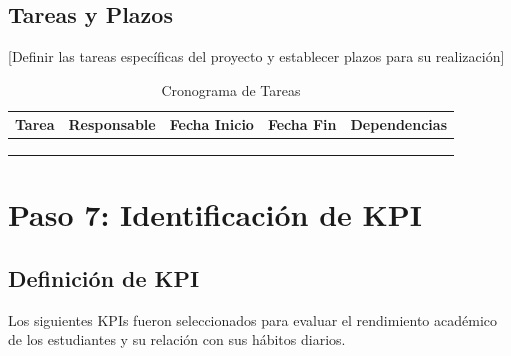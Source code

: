 \documentclass[12pt,letterpaper]{report}
\begin{document}
\subsection{Tareas y Plazos}
[Definir las tareas específicas del proyecto y establecer plazos para su realización]

\begin{table}[H]
    \centering
    \begin{tabularx}{\textwidth}{|X|X|X|X|X|}
        \hline
        \textbf{Tarea} & \textbf{Responsable} & \textbf{Fecha Inicio} & \textbf{Fecha Fin} & \textbf{Dependencias} \\
        \hline
        & & & & \\
        \hline
        & & & & \\
        \hline
        & & & & \\
        \hline
    \end{tabularx}
    \caption{Cronograma de Tareas}
\end{table}

\section{Paso 7: Identificación de KPI}

\subsection{Definición de KPI}
Los siguientes KPIs fueron seleccionados para evaluar el rendimiento académico de los estudiantes y su relación con sus hábitos diarios.
\end{document}
